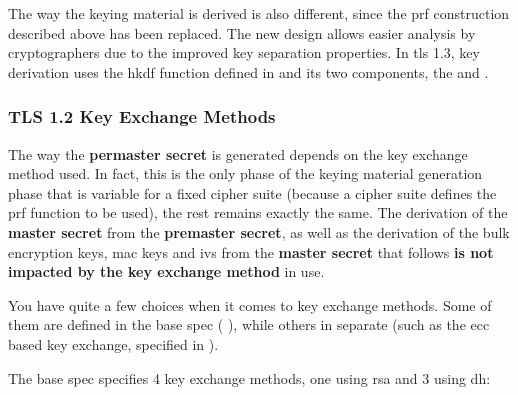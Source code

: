 \documentclass{llncs}
\begin{document}
The way the keying material is derived is also different, since the
\gls{prf} construction described above has been replaced. The
new design allows easier analysis by cryptographers due to the improved
key separation properties. In \gls{tls} 1.3, key derivation uses the
\gls{hkdf} function defined in \cite{RFC5869} and its two components,
the  and .

\subsubsection{TLS 1.2 Key Exchange Methods}

The way the \textbf{permaster secret} is generated depends on the key exchange
method used. In fact, this is the only phase of the keying material generation
phase that is variable for a fixed cipher suite (because a cipher suite defines
the \gls{prf} function to be used), the rest remains exactly the same. The derivation
of the \textbf{master secret} from the \textbf{premaster secret}, as well as the
derivation of the bulk encryption keys, \gls{mac} keys and \gls{iv}s from the \textbf{master secret}
that follows \textbf{is not impacted by the key exchange method} in use.

You have quite a few choices when it comes to key exchange methods. Some of them
are defined in the base spec ( \cite{RFC5246}), while others
in separate  (such as the \gls{ecc} based key exchange, specified
in  \cite{RFC4492}).

The base spec specifies 4 key exchange methods, one using \gls{rsa} and 3 using
\gls{dh}:
\end{document}
